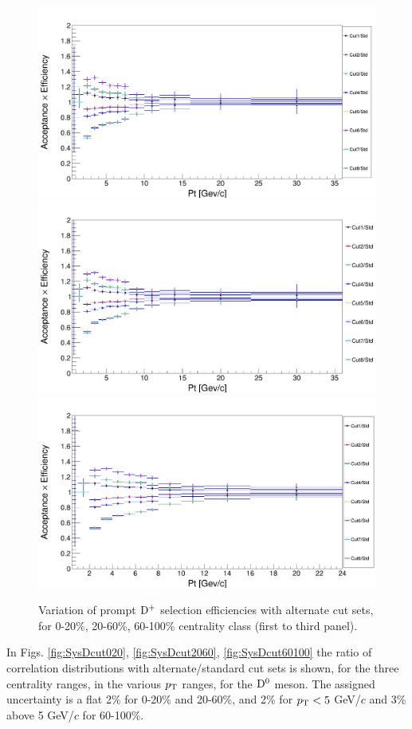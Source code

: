 \begin{figure}
\centering
{\includegraphics[width=0.48\linewidth]{Centrality_DPlus/Dplus/Eff_cmp/ratio_0_20.png}}
{\includegraphics[width=0.48\linewidth]{Centrality_DPlus/Dplus/Eff_cmp/ratio_cuts_20_60.png}}
{\includegraphics[width=0.48\linewidth]{Centrality_DPlus/Dplus/Eff_cmp/ratio_60_100.png}}
\caption{Variation of prompt ${\rm D^+}$ selection efficiencies with alternate cut sets, for 0-20\%, 20-60\%, 60-100\% centrality class (first to third panel).}
\label{fig:EffVariations_Dplus}
\end{figure}

In Figs. \ref{fig:SysDcut020}, \ref{fig:SysDcut2060}, \ref{fig:SysDcut60100} the ratio of correlation distributions with alternate/standard cut sets is shown, for the three centrality ranges, in the various $p_{\rm T}$ ranges, for the ${\rm D^0}$ meson.
The assigned uncertainty is a flat 2\% for 0-20\% and 20-60\%, and 2\% for $p_{\rm T} < 5$ GeV/$c$ and 3\% above 5 GeV/$c$ for 60-100\%.

